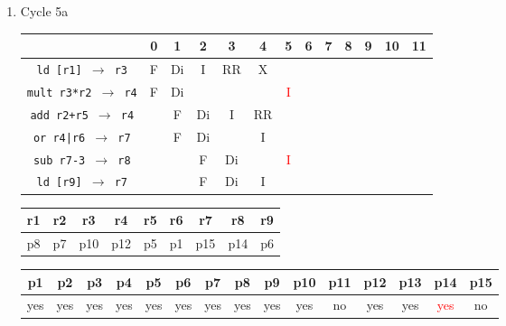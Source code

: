 \documentclass[12pt]{article}
\begin{document}
\begin{enumerate}
\begin{table}[H]
\begin{tabular}{|c|c|c|c|c|c|c|}
					\hline
				\end{tabular}
			\end{table}
		\item
			Cycle 5a
			\begin{table}[H]
				\begin{tabular}{|c|c|c|c|c|c|c|c|c|c|c|c|c|}
					\hline
					 & 0 & 1 & 2 & 3 & 4 & 5 & 6 & 7 & 8 & 9 & 10 & 11\\
					\hline
					\texttt{ld [r1] $\rightarrow$ r3} & F & Di & I & RR & X &  &  &  &  &  &  &\\
					\hline
					\texttt{mult r3*r2 $\rightarrow$ r4} & F & Di &  &  &  & \textcolor{red}{I} &  &  &  &  &  &\\
					\hline
					\texttt{add r2+r5 $\rightarrow$ r4} &  & F & Di & I & RR &  &  &  &  &  &  &\\
					\hline
					\texttt{or r4|r6 $\rightarrow$ r7} &  & F & Di &  & I &  &  &  &  &  &  &\\
					\hline
					\texttt{sub r7-3 $\rightarrow$ r8} &  &  & F & Di &  & \textcolor{red}{I} &  &  &  &  &  &\\
					\hline
					\texttt{ld [r9] $\rightarrow$ r7} &  &  & F & Di & I &  &  &  &  &  &  &\\
					\hline 
				\end{tabular}
			\end{table}
			\begin{table}[H]
				\begin{tabular}{|c|c|c|c|c|c|c|c|c|}
					\hline
					r1 & r2 & r3 & r4 & r5 & r6 & r7 & r8 & r9\\
					\hline
					p8 & p7 & p10 & p12 & p5 & p1 & p15 & p14 & p6\\
					\hline
				\end{tabular}
			\end{table}
			\begin{table}[H]
				\begin{tabular}{|c|c|c|c|c|c|c|c|c|c|c|c|c|c|c|}
					\hline
					p1 & p2 & p3 & p4 & p5 & p6 & p7 & p8 & p9 & p10 & p11 & p12 & p13 & p14 & p15\\
					\hline
					yes & yes & yes & yes & yes & yes & yes & yes & yes & yes & no & yes & yes & \textcolor{red}{yes} & no\\
					\hline
				\end{tabular}
			\end{table}
			\begin{table}[H]
				\begin{tabular}{|c|c|c|}
					\hline

\end{tabular}
\end{table}
\end{enumerate}
\end{document}
